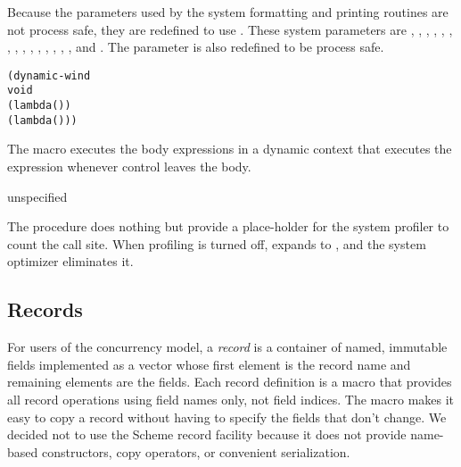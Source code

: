 Because the parameters used by the system formatting and printing
  routines are not process safe, they are redefined to use
  . These system parameters are
,
,
,
,
,
,
,
,
,
,
,
,
,
,
, and
.
The  parameter is also redefined to be
process safe.

\begin{syntax}
\end{syntax}
\expandsto{}\begin{alltt}\antipar
(dynamic-wind
  void
  (lambda ()   \etc{})
  (lambda () ))\end{alltt}

The  macro executes the body expressions 
 \etc{} in a dynamic context that executes the 
expression whenever control leaves the body.

\begin{procedure}
\end{procedure}
\returns{} unspecified

The  procedure does nothing but provide a
place-holder for the system profiler to count the call site.  When
profiling is turned off,  expands to
, and the system optimizer eliminates it.

\subsection {Records}

For users of the concurrency model, a \emph{record} is a
container of named, immutable fields implemented as a vector whose
first element is the record name and remaining elements are the
fields. Each record definition is a macro that provides all record
operations using field names only, not field indices. The macro makes
it easy to copy a record without having to specify the fields that
don't change.  We decided not to use the Scheme record facility
because it does not provide name-based constructors, copy operators,
or convenient serialization.

